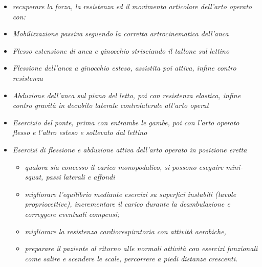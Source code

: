 \begin{itemize}
\item
  \emph{recuperare la forza, la resistenza ed il movimento articolare
  dell'arto operato con:}

\item
  
  \emph{Mobilizzazione passiva seguendo la corretta artrocinematica
  dell'anca}
  
\item
  
  \emph{Flesso estensione di anca e ginocchio strisciando il tallone sul
  lettino}
  
\item
  
  \emph{Flessione dell'anca a ginocchio esteso, assistita poi attiva,
  infine contro resistenza}
  
\item
  
  \emph{Abduzione dell'anca sul piano del letto, poi con resistenza
  elastica, infine contro gravità in decubito laterale controlaterale all'arto operat }
  
\item
  
  \emph{Esercizio del ponte, prima con entrambe le gambe, poi con l'arto
  operato flesso e l'altro esteso e sollevato dal lettino}

\item
  
  \emph{Esercizi di flessione e abduzione attiva} \emph{dell'arto
  operato in posizione eretta}
  

\begin{itemize}
\item
  
  \emph{qualora sia concesso il carico monopodalico, si possono eseguire
  mini-squat, passi laterali e affondi}
  
\item
  
  \emph{migliorare l'equilibrio mediante esercizi su superfici instabili
  (tavole propriocettive), incrementare il carico durante la deambulazione e correggere eventuali compensi;}
\item
  
  \emph{migliorare la resistenza cardiorespiratoria con attività
  aerobiche,}
  
\item
  \emph{preparare il paziente al ritorno alle normali attività con
  esercizi funzionali come salire e scendere le scale, percorrere a
  piedi distanze crescenti.}
\end{itemize}
\end{itemize}
